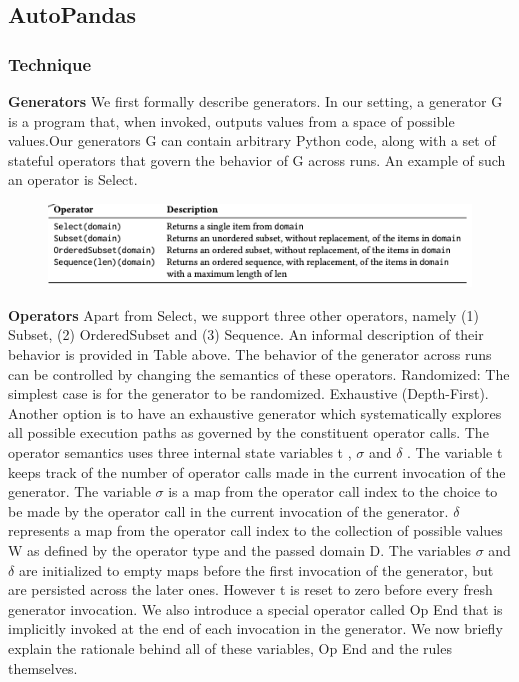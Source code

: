 \documentclass{article}
\begin{document}
\subsection{AutoPandas}
\subsubsection{Technique}
\textbf{Generators} We first formally describe generators. In our setting, a generator G is a program that, when invoked, outputs values from a space of possible values.Our generators G can contain arbitrary Python code, along with a set of stateful operators that govern the behavior of G across runs. An example of such an operator is Select.
\begin{figure}[ht]
\vskip 0.2in
\begin{center}
\centerline{\includegraphics[width=\columnwidth]{Images/Synthesis3-1.png}}
\label{icml-historical}
\end{center}
\vskip -0.2in
\end{figure}
\textbf{Operators} Apart from Select, we support three other operators, namely (1) Subset, (2) OrderedSubset and (3) Sequence. An informal description of their behavior is provided in Table above. The behavior of the generator across runs can be controlled by changing the semantics of these operators. 
Randomized: The simplest case is for the generator to be randomized.
Exhaustive (Depth-First). Another option is to have an exhaustive generator which systematically explores all possible execution paths as governed by the constituent operator calls. 
The operator semantics uses three internal state variables t , $\sigma$ and $\delta$ . The variable t keeps track of the number of operator calls made in the current invocation of the generator. The variable $\sigma$ is a map from the operator call index to the choice to be made by the operator call in the current invocation of the generator. $\delta$ represents a map from the operator call index to the collection of possible values W as defined by the operator type and the passed domain D. The variables $\sigma$ and $\delta$ are initialized to empty maps before the first invocation of the generator, but are persisted across the later ones. However t is reset to zero before every fresh generator invocation. We also introduce a special operator called Op End that is implicitly invoked at the end of each invocation in the generator. We now briefly explain the rationale behind all of these variables, Op End and the rules themselves.
\end{document}
